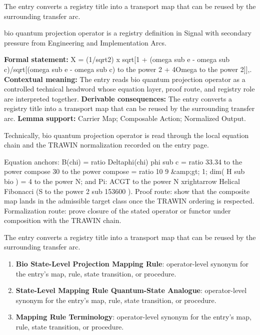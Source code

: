The entry converts a registry title into a transport map that can be reused by the surrounding transfer arc.
\clearpage


\begingroup\small
{}
bio quantum projection operator is a registry definition in Signal with secondary pressure from Engineering and Implementation Arcs.

\begingroup\footnotesize\setlength{\emergencystretch}{3em}\sloppy
\textbf{Formal statement:} X = (1/sqrt2) x sqrt[1 + (omega sub e - omega sub c)/sqrt[(omega sub e - omega sub c) to the power 2 + 4Omega to the power 2]],. \textbf{Contextual meaning:} The entry reads bio quantum projection operator as a controlled technical headword whose equation layer, proof route, and registry role are interpreted together. \textbf{Derivable consequences:} The entry converts a registry title into a transport map that can be reused by the surrounding transfer arc. \textbf{Lemma support:} Carrier Map; Composable Action; Normalized Output.\par
\endgroup

Technically, bio quantum projection operator is read through the local equation chain and the TRAWIN normalization recorded on the entry page.

Equation anchors: B(chi) = ratio Deltaphi(chi) phi sub c = ratio 33.34 to the power compose 30 to the power compose = ratio 10 9 \&amp;gt; 1; dim( H sub bio ) = 4 to the power N; and Pi: ACGT to the power N xrightarrow Helical Fibonacci (S to the power 2 sub 153600 ). Proof route: show that the composite map lands in the admissible target class once the TRAWIN ordering is respected. Formalization route: prove closure of the stated operator or functor under composition with the TRAWIN chain.

The entry converts a registry title into a transport map that can be reused by the surrounding transfer arc.
\endgroup

\begin{enumerate}[leftmargin=1.6em,itemsep=6pt,topsep=4pt]
\item \textbf{Bio State-Level Projection Mapping Rule}: operator-level synonym for the entry's map, rule, state transition, or procedure.
\item \textbf{State-Level Mapping Rule Quantum-State Analogue}: operator-level synonym for the entry's map, rule, state transition, or procedure.
\item \textbf{Mapping Rule Terminology}: operator-level synonym for the entry's map, rule, state transition, or procedure.
\end{enumerate}

